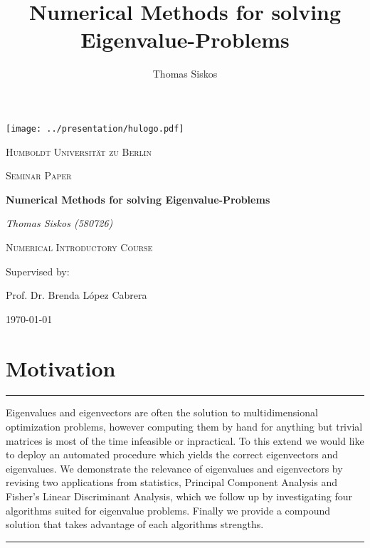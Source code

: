 \documentclass[12pt]{article}
\renewenvironment{abstract}{%

\begin{center}
\begin{minipage}{0.9\textwidth}
\rule{\textwidth}{1pt}}
{\par\noindent\rule{\textwidth}{1pt}
\end{minipage}
\end{center}}
\begin{document}
\title{Numerical Methods for solving Eigenvalue-Problems}
\author{Thomas Siskos}
\date{}

\begin{titlepage}
  \begin{center}

  \texttt{[image: ../presentation/hulogo.pdf]} \par
  {\scshape\LARGE Humboldt Universit{\"a}t zu Berlin \par}

  {\scshape\Large Seminar Paper\par}

  {\huge\bfseries Numerical Methods for solving Eigenvalue-Problems\par}

\vspace{1cm}

  {\Large\itshape Thomas Siskos (580726)\par}

  {\Large\scshape Numerical Introductory Course\par}

  \vfill
  Supervised by: \par
  {\Large Prof. Dr. Brenda L{\'o}pez Cabrera \par}
  \vfill
  {\large \today\par}
  \end{center}

\end{titlepage}

\tableofcontents
\listoftables
\listoffigures
\listofalgorithms
\newpage

\section{Motivation}

\begin{singlespacing}
\begin{abstract}
\small
Eigenvalues and eigenvectors are often the solution to multidimensional optimization problems, however computing them by hand for anything but trivial matrices is most of the time infeasible or inpractical. To this extend we would like to deploy an automated procedure which yields the correct eigenvectors and eigenvalues. We demonstrate the relevance of eigenvalues and eigenvectors by revising two applications from statistics, Principal Component Analysis and Fisher's Linear Discriminant Analysis, which we follow up by investigating four algorithms suited for eigenvalue problems. Finally we provide a compound solution that takes advantage of each algorithms strengths.  
\end{abstract}
\vspace{3mm}
\end{singlespacing}
\end{document}
